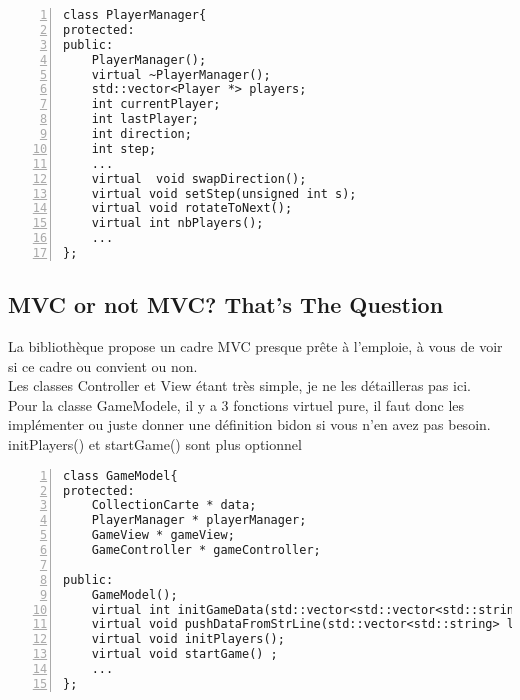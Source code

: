 \documentclass[12pt, letterpaper]{article}
\begin{document}
\begin{Verbatim}[numbers=left,xleftmargin = 5mm]
class PlayerManager{
protected:
public:
    PlayerManager();
    virtual ~PlayerManager();
    std::vector<Player *> players;
    int currentPlayer;
    int lastPlayer;
    int direction;
    int step;
    ...
    virtual  void swapDirection();
    virtual void setStep(unsigned int s);
    virtual void rotateToNext();
    virtual int nbPlayers();
    ...    
};

\end{Verbatim} 


\subsection{MVC or not MVC? That's The Question}

La bibliothèque propose un cadre MVC presque prête à l'emploie, à vous de voir si ce cadre ou convient ou non.\\
Les classes Controller et View étant très simple, je ne les détailleras pas ici.\\
Pour la classe GameModele, il y a 3 fonctions virtuel pure, il faut donc les implémenter ou juste donner une définition bidon si vous n'en avez pas besoin. 
initPlayers() et startGame() sont plus optionnel



\begin{Verbatim}[numbers=left,xleftmargin = 5mm]
class GameModel{
protected:
    CollectionCarte * data;
    PlayerManager * playerManager;
    GameView * gameView;
    GameController * gameController;
    
public:
    GameModel();
    virtual int initGameData(std::vector<std::vector<std::string>> configData);
    virtual void pushDataFromStrLine(std::vector<std::string> line) = 0;
    virtual void initPlayers();
    virtual void startGame() ;
    ...
};
\end{Verbatim} 



\end{document}
